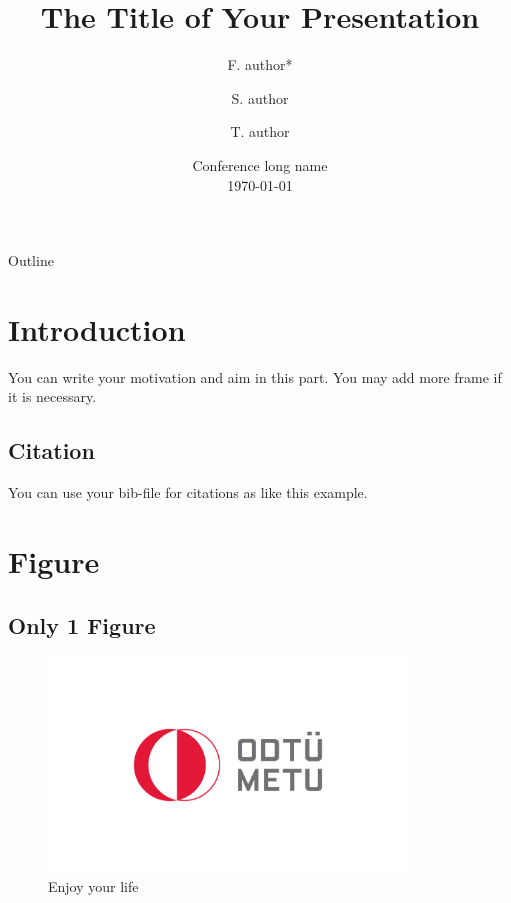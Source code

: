 \documentclass{beamer}
\title[Write a short title]{The Title of Your Presentation}
\author[Speaker]{F. author*\inst{1} \and S. author\inst{2} \and T. author\inst{3}}
\institute[METU] %
{
  \inst{1}%
	Financial Mathematics
	\inst{2}%
		Actuarial Sciences
	\inst{3}
	Scientific Computing\\
	
	Institute of Applied Mathematics\\
  Middle East Technical University\\
	
 	}
\date[Conference Short name]{Conference long name\\
\today}
\begin{document}
\begin{frame}
  \titlepage
\end{frame}

\begin{frame}{Outline}
  \tableofcontents
\end{frame}


\section{Introduction}
\begin{frame}
You can write your motivation and aim in this part. You may add more frame if it is necessary.
\end{frame}
\subsection{Citation}
\begin{frame}
You can use your bib-file for citations as like this example\cite{Chauvet2016}.
\end{frame}
\section{Figure}
\subsection{Only 1 Figure}
\begin{frame}
\begin{figure}
    \centering
    \includegraphics[width = 0.85\textwidth]{logo.jpg}
    \caption{Enjoy your life}
  \end{figure}
\end{frame}
\end{document}
